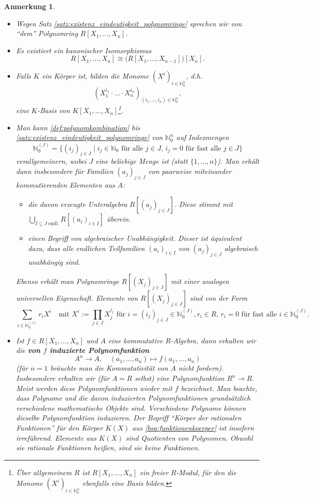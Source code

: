 \documentclass[a4paper, twoside, 11pt, ngerman]{report}
\newcommand{\NN}{\mathds N}
\theoremstyle{definistyle}
\newtheorem{anm}[satz]{Anmerkung}
\theoremstyle{remark}
\newcommand{\defn}[1]{\textit{\bfseries #1}}
\begin{document}
\begin{anm}\label{anm:eigenschaften_polynomring}
\begin{itemize}
\item Wegen Satz \ref{satz:existenz_eindeutigkeit_polynomringe} sprechen wir von "`dem"' Polynomring $R[X_1,\ldots,X_n]$.
\item Es existiert ein kanonischer Isomorphismus
\[
R[X_1, \ldots, X_n] \cong \big(R[X_1, \ldots, X_{n-1}]\big)[X_n].
\]
\item Falls $K$ ein Körper ist, bilden die Monome $(X^i)_{i \in \NN_0^n}$, d.h.
\[
(X_1^{i_1} \cdot \ldots \cdot X_n^{i_n})_{(i_1, \ldots, i_n) \in \NN_0^n},
\]
eine $K$-Basis von $K[X_1, \ldots, X_n]$\footnote{Über allgemeinem $R$ ist $R[X_1,\ldots,X_n]$ ein freier $R$-Modul, für den die Monome $(X^i)_{i \in \NN_0^n}$ ebenfalls eine Basis bilden.}.
\item Man kann \ref{def:polynomkombination} bis \ref{satz:existenz_eindeutigkeit_polynomringe} von $\NN_0^n$ auf Indexmengen
\[\NN_0^{(J)} = \{(i_j)_{j \in J} \mid i_j \in \NN_0 \text{ für alle } j \in J, \, i_j = 0 \text{ für fast alle } j \in J\}\] verallgemeinern, wobei $J$ eine beliebige Menge ist (statt $\{1, \ldots, n\}$). Man erhält dann insbesondere für Familien $(a_j)_{j \in J}$ von paarweise miteinander kommutierenden Elementen aus $A$:
\begin{itemize}
    \item die davon erzeugte Unteralgebra $R[(a_j)_{j \in J}]$. Diese stimmt mit $\bigcup_{I \subseteq J \text{ endl.}} R[(a_i)_{i \in I}]$ überein.
    \item einen Begriff von algebraischer Unabhängigkeit. Dieser ist äquivalent dazu, dass alle endlichen Teilfamilien $(a_i)_{i \in I}$ von $(a_j)_{j \in J}$ algebraisch unabhängig sind.
\end{itemize}
Ebenso erhält man Polynomringe $R[(X_j)_{j \in J}]$ mit einer analogen universellen Eigenschaft. Elemente von $R[(X_j)_{j \in J}]$ sind von der Form
\[
\sum_{i \in \NN_0^{(J)}} r_i X^i \quad \text{mit } X^i := \prod_{j \in J} X_j^{i_j} \text{ für } i = (i_j)_{j \in J} \in \NN_0^{(J)}, r_i \in R, \, r_i = 0 \text{ für fast alle } i \in \NN_0^{(J)}.
\]
\item Ist $f\in R[X_1,\ldots,X_n]$ und $A$ eine kommutative $R$-Algebra, dann erhalten wir die \defn{von $f$ induzierte Polynomfunktion}
\[
A^n\to A, \quad (a_1,\ldots,a_n)\mapsto f(a_1,\ldots,a_n)
\]
(für $n=1$ bräuchte man die Kommutativität von $A$ nicht fordern). Insbesondere erhalten wir (für $A=R$ selbst) eine Polynomfunktion $R^n\to R$. Meist werden diese Polynomfunktionen wieder mit $f$ bezeichnet. Man beachte, dass Polynome und die davon induzierten Polynomfunktionen grundsätzlich verschiedene mathematische Objekte sind. Verschiedene Polynome können dieselbe Polynomfunktion induzieren. Der Begriff "`Körper der rationalen Funktionen"' für den Körper $K(X)$ aus \ref{bsp:funktionenkoerper} ist insofern irreführend.
Elemente aus $K(X)$ sind Quotienten von Polynomen. Obwohl sie rationale Funktionen heißen, sind sie keine Funktionen.
\end{itemize}
\end{anm}
\end{document}
